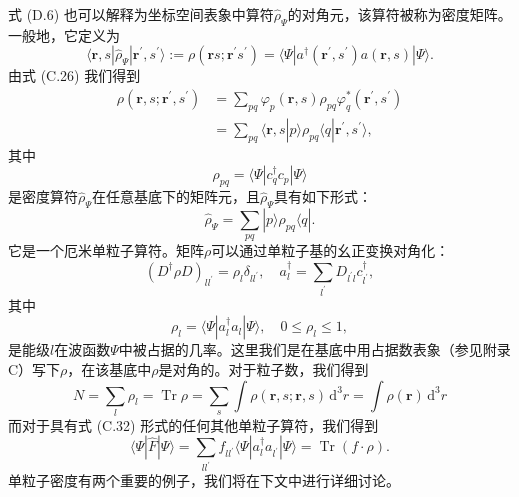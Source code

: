 式 (D.6) 也可以解释为坐标空间表象中算符$\hat{\rho}_{\Psi}$的对角元，该算符被称为密度矩阵。一般地，它定义为
\begin{equation}
\langle\boldsymbol{r},s|\hat{\rho}_{\Psi}|\boldsymbol{r}^{\prime},s^{\prime}\rangle:=\rho(\boldsymbol{r}s;\boldsymbol{r}^{\prime}s^{\prime})=\langle\Psi|a^{\dagger}(\boldsymbol{r}^{\prime},s^{\prime})a(\boldsymbol{r},s)|\Psi\rangle.\label{eq:appendix_d_density_matrix_coord}
\end{equation}
由式 (C.26) 我们得到
\begin{align}
\rho(\boldsymbol{r},s;\boldsymbol{r}^{\prime},s^{\prime}) & =\sum_{pq}\varphi_{p}(\boldsymbol{r},s)\rho_{pq}\varphi^{*}_{q}(\boldsymbol{r}^{\prime},s^{\prime})\nonumber \\
 & =\sum_{pq}\langle\boldsymbol{r},s|p\rangle\rho_{pq}\langle q|\boldsymbol{r}^{\prime},s^{\prime}\rangle,\label{eq:appendix_d_density_expansion}
\end{align}
其中
\begin{equation}
\rho_{pq}=\langle\Psi|c^{\dagger}_{q}c_{p}|\Psi\rangle\label{eq:sp density matrix}
\end{equation}
是密度算符$\hat{\rho}_{\Psi}$在任意基底下的矩阵元，且$\hat{\rho}_{\Psi}$具有如下形式：
\begin{equation}
\hat{\rho}_{\Psi}=\sum_{pq}|p\rangle\rho_{pq}\langle q|.\label{eq:density operator}
\end{equation}
它是一个厄米单粒子算符。矩阵$\rho$可以通过单粒子基的幺正变换对角化：
\begin{equation}
(D^{\dagger}\rho D)_{ll^{\prime}}=\rho_{l}\delta_{ll^{\prime}},\quad a^{\dagger}_{l}=\sum_{l^{\prime}}D_{l^{\prime}l}c^{\dagger}_{l^{\prime}},\label{eq:appendix_d_diagonalization}
\end{equation}
其中
\begin{equation}
\rho_{l}=\langle\Psi|a^{\dagger}_{l}a_{l}|\Psi\rangle,\quad0\leqslant\rho_{l}\leqslant1,\label{eq:appendix_d_rho_eigenvalues}
\end{equation}
是能级$l$在波函数$\Psi$中被占据的几率。这里我们是在基底中用占据数表象（参见附录C）写下$\rho$，在该基底中$\rho$是对角的。对于粒子数，我们得到
\begin{equation}
N=\sum_{l}\rho_{l}=\mathop{\text{Tr}}\rho=\sum_{s}\int\rho(\boldsymbol{r},s;\boldsymbol{r},s)\,\mathrm{d}^{3}r=\int\rho(\boldsymbol{r})\,\mathrm{d}^{3}r\label{eq:appendix_d_total_particle_number}
\end{equation}
而对于具有式 (C.32) 形式的任何其他单粒子算符，我们得到
\begin{equation}
\langle\Psi|\hat{F}|\Psi\rangle=\sum_{ll^{\prime}}f_{ll^{\prime}}\langle\Psi|a^{\dagger}_{l}a_{l^{\prime}}|\Psi\rangle=\mathop{\text{Tr}}(f\cdot\rho).\label{eq:appendix_d_trace_formula}
\end{equation}
单粒子密度有两个重要的例子，我们将在下文中进行详细讨论。

